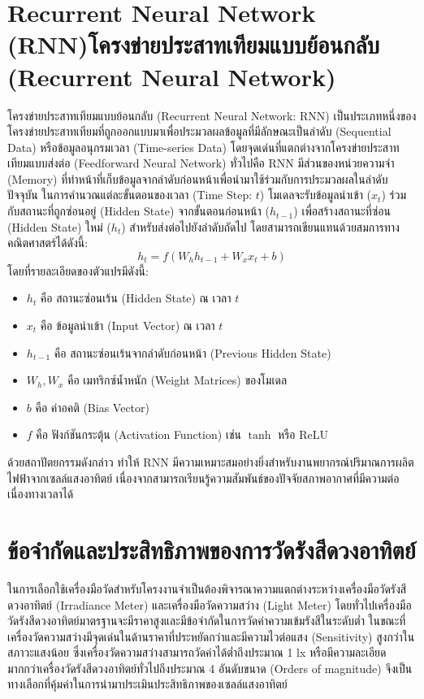 \section{\ifenglish Recurrent Neural Network (RNN)\else โครงข่ายประสาทเทียมแบบย้อนกลับ (Recurrent Neural Network)\fi}
\hspace{\parindent}โครงข่ายประสาทเทียมแบบย้อนกลับ (Recurrent Neural Network: RNN) เป็นประเภทหนึ่งของโครงข่ายประสาทเทียมที่ถูกออกแบบมาเพื่อประมวลผลข้อมูลที่มีลักษณะเป็นลำดับ (Sequential Data) หรือข้อมูลอนุกรมเวลา (Time-series Data) โดยจุดเด่นที่แตกต่างจากโครงข่ายประสาทเทียมแบบส่งต่อ (Feedforward Neural Network) ทั่วไปคือ RNN มีส่วนของหน่วยความจำ (Memory) ที่ทำหน้าที่เก็บข้อมูลจากลำดับก่อนหน้าเพื่อนำมาใช้ร่วมกับการประมวลผลในลำดับปัจจุบัน
ในการคำนวณแต่ละขั้นตอนของเวลา (Time Step: $t$) โมเดลจะรับข้อมูลนำเข้า ($x_t$) ร่วมกับสถานะที่ถูกซ่อนอยู่ (Hidden State) จากขั้นตอนก่อนหน้า ($h_{t-1}$) เพื่อสร้างสถานะที่ซ่อน (Hidden State) ใหม่ ($h_t$) สำหรับส่งต่อไปยังลำดับถัดไป โดยสามารถเขียนแทนด้วยสมการทางคณิตศาสตร์ได้ดังนี้:
\begin{equation}
    h_t = f(W_h h_{t-1} + W_x x_t + b)
\end{equation}
\noindent โดยที่รายละเอียดของตัวแปรมีดังนี้:
\begin{itemize}
    \item $h_t$ คือ สถานะซ่อนเร้น (Hidden State) ณ เวลา $t$
    \item $x_t$ คือ ข้อมูลนำเข้า (Input Vector) ณ เวลา $t$
    \item $h_{t-1}$ คือ สถานะซ่อนเร้นจากลำดับก่อนหน้า (Previous Hidden State)
    \item $W_h, W_x$ คือ เมทริกซ์น้ำหนัก (Weight Matrices) ของโมเดล
    \item $b$ คือ ค่าอคติ (Bias Vector)
    \item $f$ คือ ฟังก์ชันกระตุ้น (Activation Function) เช่น $\tanh$ หรือ $\text{ReLU}$
\end{itemize}
\hspace{\parindent}ด้วยสถาปัตยกรรมดังกล่าว ทำให้ RNN มีความเหมาะสมอย่างยิ่งสำหรับงานพยากรณ์ปริมาณการผลิตไฟฟ้าจากเซลล์แสงอาทิตย์ เนื่องจากสามารถเรียนรู้ความสัมพันธ์ของปัจจัยสภาพอากาศที่มีความต่อเนื่องทางเวลาได้ \cite{rumelhart1986}\cite{bengio1994}\cite{bualabs_rnn}

\section{ข้อจำกัดและประสิทธิภาพของการวัดรังสีดวงอาทิตย์}
\hspace{\parindent}ในการเลือกใช้เครื่องมือวัดสำหรับโครงงานจำเป็นต้องพิจารณาความแตกต่างระหว่างเครื่องมือวัดรังสีดวงอาทิตย์ (Irradiance Meter) และเครื่องมือวัดความสว่าง (Light Meter) โดยทั่วไปเครื่องมือวัดรังสีดวงอาทิตย์มาตรฐานจะมีราคาสูงและมีข้อจำกัดในการวัดค่าความเข้มรังสีในระดับต่ำ ในขณะที่เครื่องวัดความสว่างมีจุดเด่นในด้านราคาที่ประหยัดกว่าและมีความไวต่อแสง (Sensitivity) สูงกว่าในสภาวะแสงน้อย ซึ่งเครื่องวัดความสว่างสามารถวัดค่าได้ต่ำถึงประมาณ 1 lx หรือมีความละเอียดมากกว่าเครื่องวัดรังสีดวงอาทิตย์ทั่วไปถึงประมาณ 4 อันดับขนาด (Orders of magnitude) จึงเป็นทางเลือกที่คุ้มค่าในการนำมาประเมินประสิทธิภาพของเซลล์แสงอาทิตย์

